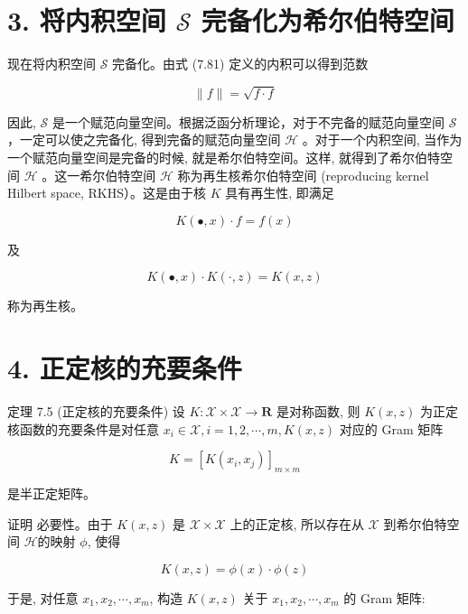 \documentclass[10pt]{article}
\begin{document}
\section*{3. 将内积空间 $\mathcal{S}$ 完备化为希尔伯特空间}
现在将内积空间 $\mathcal{S}$ 完备化。由式 (7.81) 定义的内积可以得到范数


\begin{equation*}
\|f\|=\sqrt{f \cdot f} \tag{7.82}
\end{equation*}


因此, $\mathcal{S}$ 是一个赋范向量空间。根据泛函分析理论，对于不完备的赋范向量空间 $\mathcal{S}$ ，一定可以使之完备化, 得到完备的赋范向量空间 $\mathcal{H}$ 。对于一个内积空间, 当作为一个赋范向量空间是完备的时候, 就是希尔伯特空间。这样, 就得到了希尔伯特空间 $\mathcal{H}$ 。这一希尔伯特空间 $\mathcal{H}$ 称为再生核希尔伯特空间 (reproducing kernel Hilbert space, RKHS）。这是由于核 $K$ 具有再生性, 即满足


\begin{equation*}
K(\bullet, x) \cdot f=f(x) \tag{7.83}
\end{equation*}


及


\begin{equation*}
K(\bullet, x) \cdot K(\cdot, z)=K(x, z) \tag{7.84}
\end{equation*}


称为再生核。

\section*{4. 正定核的充要条件}
定理 7.5 (正定核的充要条件) 设 $K: \mathcal{X} \times \mathcal{X} \rightarrow \boldsymbol{R}$ 是对称函数, 则 $K(x, z)$ 为正定核函数的充要条件是对任意 $x_{i} \in \mathcal{X}, i=1,2, \cdots, m, K(x, z)$ 对应的 Gram 矩阵


\begin{equation*}
K=\left[K\left(x_{i}, x_{j}\right)\right]_{m \times m} \tag{7.85}
\end{equation*}


是半正定矩阵。

证明 必要性。由于 $K(x, z)$ 是 $\mathcal{X} \times \mathcal{X}$ 上的正定核, 所以存在从 $\mathcal{X}$ 到希尔伯特空间 $\mathcal{H}$的映射 $\phi$, 使得

$$
K(x, z)=\phi(x) \cdot \phi(z)
$$

于是, 对任意 $x_{1}, x_{2}, \cdots, x_{m}$, 构造 $K(x, z)$ 关于 $x_{1}, x_{2}, \cdots, x_{m}$ 的 Gram 矩阵:
\end{document}
